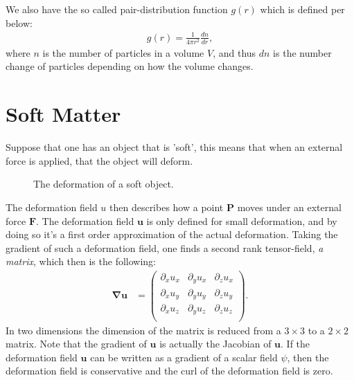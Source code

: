\documentclass[a4paper]{article}
\newcommand{\grad}{\mathbf{\nabla}}
\begin{document}
\vspace*{0.5cm}\noindent
We also have the so called pair-distribution function $g(r)$ which is defined per below:
\begin{align*}
    g(r) = \frac{1}{4\pi r^2}\frac{dn}{dr},
\end{align*}where $n$ is the number of particles in a volume $V$, and thus $dn$ is the number change of particles depending on how the volume changes.
\section{Soft Matter}\label{sec: Soft matter}
Suppose that one has an object that is 'soft', this means that when an external force is applied, that the object will deform.
\begin{figure}[H]
    \centering
    \caption{The deformation of a soft object.}
    \label{fig: soft object deformation derivation}
\end{figure}\noindent
The deformation field $u$ then describes how a point $\mathbf{P}$ moves under an external force $\mathbf{F}$. The deformation field $\mathbf{u}$ is only defined for small deformation, and by doing so it's a first order approximation of the actual deformation.
Taking the gradient of such a deformation field, one finds a second rank tensor-field, \textit{a matrix}, which then is the following:
\begin{align*}
    \grad{\mathbf{u}} &= \begin{pmatrix}
        \partial_x u_x & \partial_y u_x & \partial_z u_x\\
        \partial_x u_y & \partial_y u_y & \partial_z u_y\\
        \partial_x u_z & \partial_y u_z & \partial_z u_z\\
    \end{pmatrix}.
\end{align*}In two dimensions the dimension of the matrix is reduced from a $3\times 3$ to a $2\times 2$ matrix. Note that the gradient of $\mathbf{u}$ is actually the Jacobian of $\mathbf{u}$. If the deformation field $\mathbf{u}$ can be written as a gradient of a scalar field $\psi$, then the deformation field is conservative and the curl of the deformation field is zero.
\end{document}
